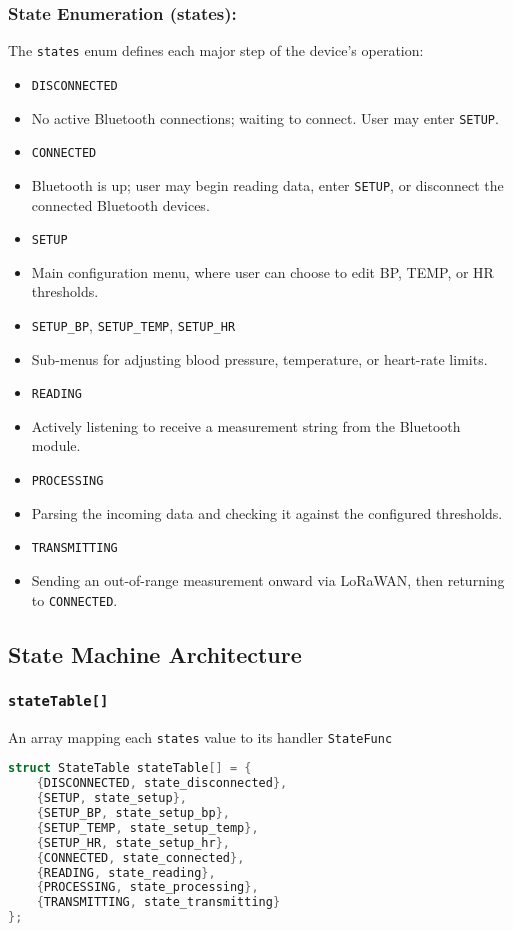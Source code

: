 \subsubsection{State Enumeration (states):}
The \lstinline|states| enum defines each major step of the device's operation:
\begin{itemize}
	\item \lstinline|DISCONNECTED|
	\item[] No active Bluetooth connections; waiting to connect. User may enter \lstinline|SETUP|.
	\item \lstinline|CONNECTED|
	\item[] Bluetooth is up; user may begin reading data, enter \lstinline|SETUP|, or disconnect the connected Bluetooth devices.
	\item \lstinline|SETUP|
	\item[] Main configuration menu, where user can choose to edit BP, TEMP, or HR thresholds.
	\item \lstinline|SETUP_BP|, \lstinline|SETUP_TEMP|, \lstinline|SETUP_HR|
	\item[] Sub-menus for adjusting blood pressure, temperature, or heart-rate limits.
	\item \lstinline|READING|
	\item[] Actively listening to receive a measurement string from the Bluetooth module.
	\item \lstinline|PROCESSING|
	\item[] Parsing the incoming data and checking it against the configured thresholds.
	\item \lstinline|TRANSMITTING|
	\item[] Sending an out-of-range measurement onward via LoRaWAN, then returning to \lstinline|CONNECTED|.
\end{itemize}

\subsection{State Machine Architecture}
\subsubsection{\lstinline|stateTable[]|}
An array mapping each \lstinline|states| value to its handler \lstinline|StateFunc|
\begin{lstlisting}[language=C++]
struct StateTable stateTable[] = {
	{DISCONNECTED, state_disconnected},
	{SETUP, state_setup},
	{SETUP_BP, state_setup_bp},
	{SETUP_TEMP, state_setup_temp},
	{SETUP_HR, state_setup_hr},
	{CONNECTED, state_connected},
	{READING, state_reading},
	{PROCESSING, state_processing},
	{TRANSMITTING, state_transmitting}
};
\end{lstlisting}

